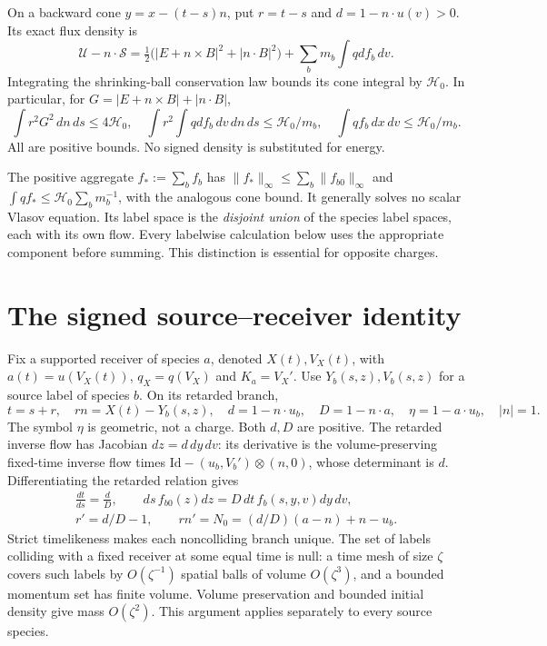 \documentclass[11pt]{article}
\newcommand{\Id}{\mathrm{Id}}
\theoremstyle{remark}\newtheorem{remark}[theorem]{Remark}
\numberwithin{equation}{section}
\begin{document}
On a backward cone $y=x-(t-s)n$, put $r=t-s$ and
$d=1-n\cdot u(v)>0$. Its exact flux density is
\[
 \mathcal U-n\cdot\mathcal S=
 \tfrac12\bigl(|E+n\times B|^2+|n\cdot B|^2\bigr)
       +\sum_b m_b\int qdf_b\,dv.
\]
Integrating the shrinking-ball conservation law bounds its cone integral
by $\mathcal H_0$. In particular, for $G=|E+n\times B|+|n\cdot B|$,
\begin{equation}\label{eq:budgets}
 \int r^2G^2\,dn\,ds\le4\mathcal H_0,\quad
 \int r^2\int qdf_b\,dv\,dn\,ds\le\mathcal H_0/m_b,
 \quad\int qf_b\,dx\,dv\le\mathcal H_0/m_b.
\end{equation}
All are positive bounds. No signed density is substituted for energy.

The positive aggregate $f_*:=\sum_b f_b$ has
$\|f_*\|_\infty\le\sum_b\|f_{b0}\|_\infty$ and
$\int qf_*\le\mathcal H_0\sum_bm_b^{-1}$, with the analogous cone bound.
It generally solves no scalar Vlasov equation. Its label space is the
\emph{disjoint union} of the species label spaces, each with its own flow.
Every labelwise calculation below uses the appropriate component before
summing. This distinction is essential for opposite charges.

\section{The signed source--receiver identity}
Fix a supported receiver of species $a$, denoted $X(t),V_X(t)$, with
$a(t)=u(V_X(t))$, $q_X=q(V_X)$ and $K_a=V_X'$. Use $Y_b(s,z),V_b(s,z)$
for a source label of species $b$. On its retarded branch,
\begin{equation}\label{eq:geometry}
 t=s+r,\quad rn=X(t)-Y_b(s,z),\quad
 d=1-n\cdot u_b,\quad D=1-n\cdot a,\quad \eta=1-a\cdot u_b,
 \quad |n|=1.
\end{equation}
The symbol $\eta$ is geometric, not a charge. Both $d,D$ are positive.
The retarded inverse flow has Jacobian $dz=d\,dy\,dv$: its derivative is
the volume-preserving fixed-time inverse flow times
$\Id-(u_b,V_b')\otimes(n,0)$, whose determinant is $d$.
Differentiating the retarded relation gives
\begin{equation}\label{eq:measure}
 \begin{gathered}
 \frac{dt}{ds}=\frac dD,\qquad
 ds\,f_{b0}(z)dz=D\,dt\,f_b(s,y,v)dy\,dv,\\
 r'=d/D-1,\qquad rn'=N_0=(d/D)(a-n)+n-u_b.
 \end{gathered}
\end{equation}
Strict timelikeness makes each noncolliding branch unique. The set of labels
colliding with a fixed receiver at some equal time is null: a time mesh
of size $\zeta$ covers such labels by $O(\zeta^{-1})$ spatial balls of
volume $O(\zeta^3)$, and a bounded momentum set has finite volume.
Volume preservation and bounded initial density give mass $O(\zeta^2)$.
This argument applies separately to every source species.
\end{document}
